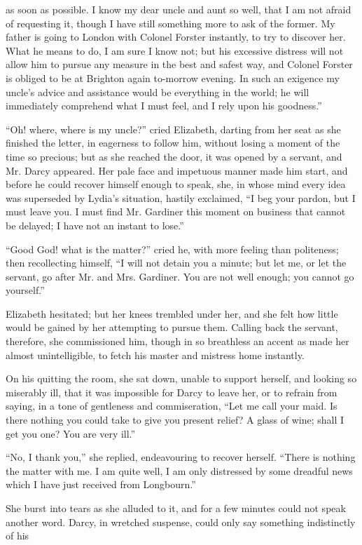 \documentclass[12pt,openright]{book}
\begin{document}
as soon as possible. I know my dear uncle and aunt so well, that I am not afraid of requesting it, though I have still something more to ask of the former. My father is going to London with Colonel Forster instantly, to try to discover her. What he means to do, I am sure I know not; but his excessive distress will not allow him to pursue any measure in the best and safest way, and Colonel Forster is obliged to be at Brighton again to-morrow evening. In such an exigence my uncle’s advice and assistance would be everything in the world; he will immediately comprehend what I must feel, and I rely upon his goodness.”

“Oh! where, where is my uncle?” cried Elizabeth, darting from her seat as she finished the letter, in eagerness to follow him, without losing a moment of the time so precious; but as she reached the door, it was opened by a servant, and Mr. Darcy appeared. Her pale face and impetuous manner made him start, and before he could recover himself enough to speak, she, in whose mind every idea was superseded by Lydia’s situation, hastily exclaimed, “I beg your pardon, but I must leave you. I must find Mr. Gardiner this moment on business that cannot be delayed; I have not an instant to lose.”

“Good God! what is the matter?” cried he, with more feeling than politeness; then recollecting himself, “I will not detain you a minute; but let me, or let the servant, go after Mr. and Mrs. Gardiner. You are not well enough; you cannot go yourself.”

Elizabeth hesitated; but her knees trembled under her, and she felt how little would be gained by her attempting to pursue them. Calling back the servant, therefore, she commissioned him, though in so breathless an accent as made her almost unintelligible, to fetch his master and mistress home instantly.

On his quitting the room, she sat down, unable to support herself, and looking so miserably ill, that it was impossible for Darcy to leave her, or to refrain from saying, in a tone of gentleness and commiseration, “Let me call your maid. Is there nothing you could take to give you present relief? A glass of wine; shall I get you one? You are very ill.”

“No, I thank you,” she replied, endeavouring to recover herself. “There is nothing the matter with me. I am quite well, I am only distressed by some dreadful news which I have just received from Longbourn.”

She burst into tears as she alluded to it, and for a few minutes could not speak another word. Darcy, in wretched suspense, could only say something indistinctly of his
\end{document}
